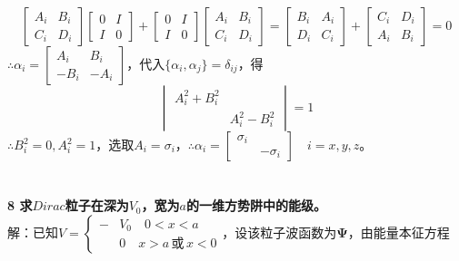 \documentclass[12pt]{article}
\numberwithin{equation}{section}	 %
\begin{document}
\begin{spacing}{1.5}
\begin{equation}
\begin{bmatrix} A_{i} & B_{i} \\ C_{i} & D_{i} \end{bmatrix}\begin{bmatrix} 0 & I \\ I & 0 \end{bmatrix} + \begin{bmatrix} 0 & I \\ I & 0 \end{bmatrix}\begin{bmatrix} A_{i} & B_{i} \\ C_{i} & D_{i} \end{bmatrix} = \begin{bmatrix} B_{i} & A_{i} \\ D_{i} & C_{i} \end{bmatrix}+\begin{bmatrix} C_{i} & D_{i} \\ A_{i} & B_{i} \end{bmatrix}=0
\end{equation}
$\therefore \alpha_{i}=\begin{bmatrix} A_{i} & B_{i} \\ -B_{i} & -A_{i} \end{bmatrix}$，代入$\{\alpha_{i},\alpha_{j}\}=\delta_{ij}$，得\\
\begin{equation}
\begin{vmatrix} A_{i}^{2}+B_{i}^{2} & \quad \\ \quad & A_{i}^{2}-B_{i}^{2} \end{vmatrix} = 1
\end{equation}
$\therefore B_{i}^{2}=0,A_{i}^{2}=1$，选取$A_{i}=\sigma_{i}$，$\therefore \alpha_{i}=\begin{bmatrix} \sigma_{i} & \quad \\ \quad & -\sigma_{i} \end{bmatrix}\quad i=x,y,z$。\\
~\\
~\\
\textbf{8 \quad 求$Dirac$粒子在深为$V_{0}$，宽为$a$的一维方势阱中的能级。}\\
解：已知$V=\left\{ 
\begin{aligned} 	%
-&V_{0} \quad 0<x<a \\ 
&0 \quad x>a\,\text{或}\,x<0
\end{aligned} \right. $，设该粒子波函数为$\bm\Psi$，由能量本征方程 \\

\end{spacing}
\end{document}
